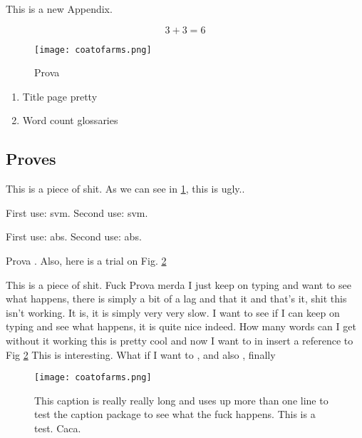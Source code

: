 
This is a new Appendix.

\begin{equation}
3+3 = 6
\end{equation}

\begin{figure}[htbp]
\begin{center}
\texttt{[image: coatofarms.png]}
\caption{Prova}
\label{fig:prova}
\end{center}
\end{figure}

\begin{enumerate}

\item Title page pretty

\item Word count glossaries

\end{enumerate}


\subsection{Proves}


This is a piece of shit. As we can see in \ref{fig:prova}, this is ugly.\cite{Dicken2007}.

First use: \gls{svm}. Second use: \gls{svm}.

First use: \gls{abs}. Second use: \gls{abs}.

Prova \cite{mike}. Also, here is a trial on Fig. \ref{caca}


This is a piece of shit. Fuck Prova merda I just keep on typing and want to see what happens, there is simply a bit of a lag and that it and that's it, shit this isn't working. It is, it is simply very very slow. I want to see if I can keep on typing and see what happens, it is quite nice indeed. How many words can I get without it working this is pretty cool and now I want to in insert a reference to Fig \ref{caca} This is interesting. What if I want to \cite{mike}, and also \cite{mierda}, finally \cite{Nelder1965}

\begin{figure}[htbp]
\begin{center}
\texttt{[image: coatofarms.png]}
\caption{This caption is really really long and uses up more than one line to test the caption package to see what the fuck happens. This is a test. Caca.}
\label{caca}
\end{center}
\end{figure}



